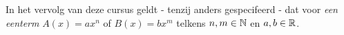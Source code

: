 \documentclass{ximera}
\begin{document}















\begin{notation}

	In het vervolg van deze cursus geldt - tenzij anders gespecifeerd - dat voor \textit{ een eenterm} $A(x) = ax^n$ of $B(x) = bx^m$ telkens $n,m\in \mathbb{N}$ en $a,b\in \mathbb{R}$.
\end{notation}
	
\end{document}
